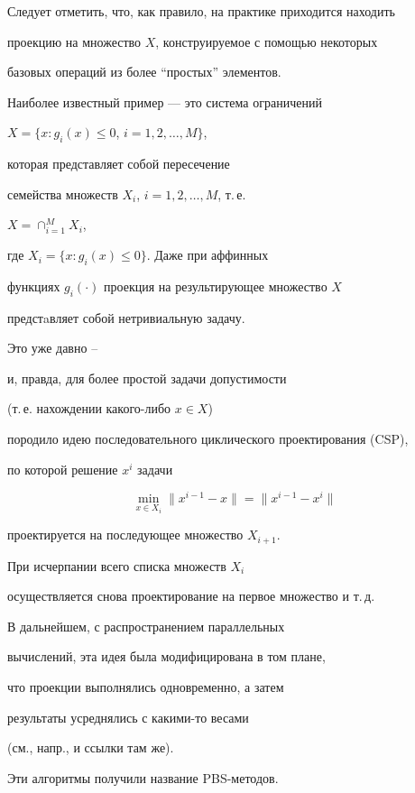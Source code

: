 Следует отметить, что, как правило, на практике приходится находить


проекцию на множество $X$, конструируемое с помощью некоторых 


базовых операций из более ``простых'' элементов.


Наиболее известный пример --- это система ограничений


$ X = \lbrace x: g_i(x) \leq 0$, $i = 1, 2, \dotsc, M \rbrace$,


которая представляет собой пересечение


семейства множеств $X_i$, $i = 1, 2, \dotsc, M$, т.\,е.


$X = \cap_{i=1}^M X_i$,


где $X_i = \lbrace x: g_i(x) \leq 0 \rbrace$. Даже при аффинных 


функциях $g_i(\cdot)$ проекция на результирующее множество $X$


предстaвляет собой нетривиальную задачу.


Это уже давно \cite{kacz}--\cite{btp}


и, правда, для более простой задачи допустимости


(т.\,е. нахождении какого-либо $x\in X$)


породило идею последовательного циклического проектирования (CSP),


по которой решение $x^i$ задачи


\begin{equation}\label{sysi}


\min_{x\in X_i} \| x^{i-1}-x\| = \| x^{i-1} - x^i\|


\end{equation}


проектируется на последующее множество $X_{i+1}$.


При исчерпании всего списка множеств $X_i$


осуществляется снова проектирование на первое множество и т.\,д.





В дальнейшем, с распространением параллельных 


вычислений, эта идея была модифицирована в том плане,


что проекции выполнялись одновременно, а затем 


результаты усреднялись с какими-то весами


(см., напр., \cite{pbs} и ссылки там же).


Эти алгоритмы получили название PBS-методов.


